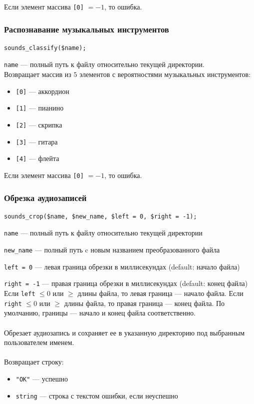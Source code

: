 \documentclass[14pt,a4paper]{article}
\begin{document}
\noindent Если элемент массива \lstinline{[0]} $= -1$, то ошибка.

\subsubsection*{Распознавание музыкальных инструментов}

\begin{lstlisting}
sounds_classify($name);
\end{lstlisting}

\lstinline{name} --- полный путь к файлу относительно текущей директории. \\

\noindent Возвращает массив из $5$ элементов с вероятностями музыкальных инструментов:
\smallskip 
\begin{itemize}
\item[] \lstinline{[0]} --- аккордион
\item[] \lstinline{[1]} --- пианино
\item[] \lstinline{[2]} --- скрипка
\item[] \lstinline{[3]} --- гитара
\item[] \lstinline{[4]} --- флейта
\end{itemize}

\noindent Если элемент массива \lstinline{[0]} $= -1$, то ошибка.

\subsubsection*{Обрезка аудиозаписей}

\begin{lstlisting}
sounds_crop($name, $new_name, $left = 0, $right = -1);
\end{lstlisting}

\lstinline{name} --- полный путь к файлу относительно текущей директории \par
\lstinline{new_name} --- полный путь c новым названием преобразованного файла \par
\lstinline{left = 0} --- левая граница обрезки в миллисекундах (default: начало файла) \par
\lstinline{right = -1} --- правая граница обрезки в миллисекундах (default: конец файла) \\

\noindent Если \lstinline{left} $\leq 0$ или $\geq$ длины файла, то левая граница --- начало файла. Если \lstinline{right} $\leq 0$ или $\geq$ длины файла, то правая граница --- конец файла. По умолчанию, границы --- начало и конец файла соответственно. \\\\
Обрезает аудиозапись и сохраняет ее в указанную директорию под выбранным пользователем именем. \\\\
Возвращает строку:
\smallskip
\begin{itemize}
\item \lstinline{"OK"} --- успешно
\item \lstinline{string} --- строка с текстом ошибки, если неуспешно
\end{itemize}
\end{document}
